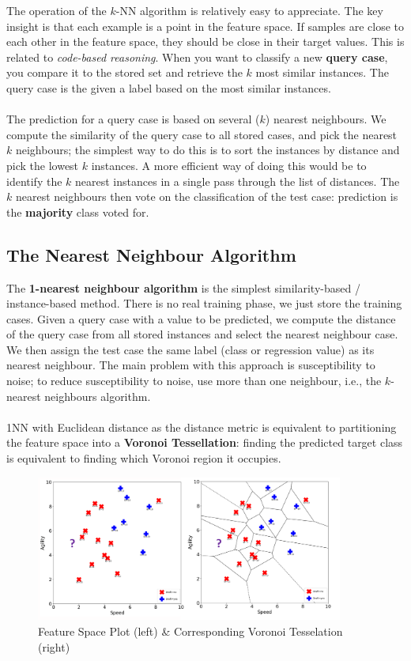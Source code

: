 \documentclass[a4paper,11pt]{article}
\begin{document}
The operation of the $k$-NN algorithm is relatively easy to appreciate.
The key insight is that each example is a point in the feature space.
If samples are close to each other in the feature space, they should be close in their target values.
This is related to \textit{code-based reasoning}.
When you want to classify a new \textbf{query case}, you compare it to the stored set and retrieve the $k$ most similar instances.
The query case is the given a label based on the most similar instances.
\\\\
The prediction for a query case is based on several ($k$) nearest neighbours.
We compute the similarity of the query case to all stored cases, and pick the nearest $k$ neighbours;
the simplest way to do this is to sort the instances by distance and pick the lowest $k$ instances.
A more efficient way of doing this would be to identify the $k$ nearest instances in a single pass through the list of distances.
The $k$ nearest neighbours then vote on the classification of the test case: prediction is the \textbf{majority} class voted for.

\subsection{The Nearest Neighbour Algorithm}
The \textbf{1-nearest neighbour algorithm} is the simplest similarity-based / instance-based method.
There is no real training phase, we just store the training cases.
Given a query case with a value to be predicted, we compute the distance of the query case from all stored instances and select the nearest neighbour case.
We then assign the test case the same label (class or regression value) as its nearest neighbour.
The main problem with this approach is susceptibility to noise; to reduce susceptibility to noise, use more than one neighbour, i.e., the $k$-nearest neighbours algorithm.
\\\\
1NN with Euclidean distance as the distance metric is equivalent to partitioning the feature space into a \textbf{Voronoi Tessellation}:
finding the predicted target class is equivalent to finding which Voronoi region it occupies.

\begin{figure}[H]
    \centering
    \includegraphics[width=0.9\textwidth]{images/voronoi.png}
    \caption{Feature Space Plot (left) \& Corresponding Voronoi Tesselation (right)}
\end{figure}
\end{document}
